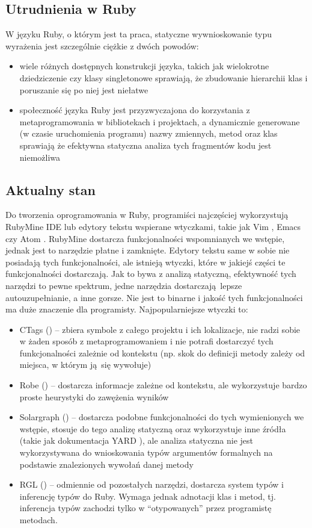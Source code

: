 \documentclass[declaration,shortabstract,mgr]{iithesis}
\begin{document}
\subsection{Utrudnienia w Ruby}

W języku Ruby, o którym jest ta praca, statyczne wywnioskowanie typu wyrażenia jest szczególnie ciężkie z dwóch powodów:
\begin{itemize}
\item wiele różnych dostępnych konstrukcji języka, takich jak wielokrotne dziedziczenie czy klasy singletonowe sprawiają, że zbudowanie hierarchii klas i poruszanie się po niej jest niełatwe
\item społeczność języka Ruby jest przyzwyczajona do korzystania z metaprogramowania w bibliotekach i projektach, a dynamicznie generowane (w czasie uruchomienia programu) nazwy zmiennych, metod oraz klas sprawiają że efektywna statyczna analiza tych fragmentów kodu jest niemożliwa
\end{itemize}

\subsection{Aktualny stan}

Do tworzenia oprogramowania w Ruby, programiści najczęściej wykorzystują RubyMine IDE \cite{RUBYMINE} lub edytory tekstu wspierane wtyczkami, takie jak Vim \cite{VIM}, Emacs \cite{EMACS} czy Atom \cite{ATOM}.
RubyMine dostarcza funkcjonalności wspomnianych we wstępie, jednak jest to narzędzie płatne i zamknięte.
Edytory tekstu same w sobie nie posiadają tych funkcjonalności, ale istnieją wtyczki, które w jakiejś części te funkcjonalności dostarczają. Jak to bywa z analizą statyczną, efektywność tych narzędzi to pewne spektrum, jedne narzędzia dostarczają lepsze autouzupełnianie, a inne gorsze. Nie jest to binarne i jakość tych funkcjonalności ma duże znaczenie dla programisty.
Najpopularniejsze wtyczki to:
\begin{itemize}
\item CTags (\cite{CTAGS}) -- zbiera symbole z całego projektu i ich lokalizacje, nie radzi sobie w żaden sposób z metaprogramowaniem i nie potrafi dostarczyć tych funkcjonalności zależnie od kontekstu (np. skok do definicji metody zależy od miejsca, w którym ją się wywołuje)
\item Robe (\cite{ROBE}) -- dostarcza informacje zależne od kontekstu, ale wykorzystuje bardzo proste heurystyki do zawężenia wyników
\item Solargraph (\cite{SOLARGRAPH}) -- dostarcza podobne funkcjonalności do tych wymienionych we wstępie, stosuje do tego analizę statyczną oraz wykorzystuje inne źródła (takie jak dokumentacja YARD \cite{YARD}), ale analiza statyczna nie jest wykorzystywana do wnioskowania typów argumentów formalnych na podstawie znalezionych wywołań danej metody
\item RGL (\cite{RDL}) -- odmiennie od pozostałych narzędzi, dostarcza system typów i inferencję typów do Ruby. Wymaga jednak adnotacji klas i metod, tj. inferencja typów zachodzi tylko w ``otypowanych'' przez programistę metodach.
\end{itemize}
\end{document}
